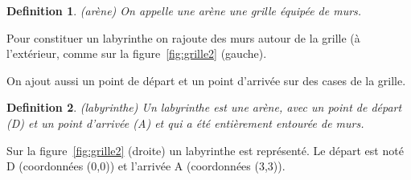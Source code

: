 \documentclass[a4paper]{paper}
\newtheorem{definition}{Definition}
\begin{document}
\begin{definition}{(arène)}
On appelle une \emph{arène} une grille équipée de murs.
\end{definition}

Pour constituer un labyrinthe on rajoute des murs autour de la grille (à l'extérieur, comme sur la figure~\ref{fig:grille2} (gauche).

On ajout aussi un point de départ et un point d'arrivée sur des cases de la grille.

\begin{definition}{(\emph{labyrinthe})}
Un labyrinthe est une arène, avec  un point de départ (D) et un point d'arrivée (A) et qui a été entièrement entourée de murs.%
\end{definition}

Sur la figure~\ref{fig:grille2} (droite) un labyrinthe est représenté.
Le départ est noté D (coordonnées (0,0)) et l'arrivée A (coordonnées (3,3)).
\end{document}
